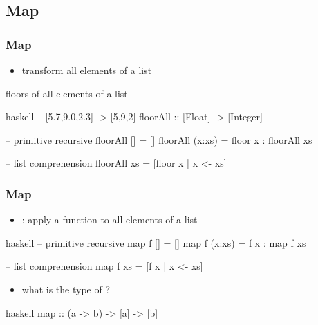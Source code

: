 \documentclass[dvipsnames]{beamer}
\theoremstyle{plain}
\begin{document}
\subsection{Map}

\begin{frame}[fragile]
  \frametitle{Map}

  \begin{itemize}
    \item transform all elements of a list
  \end{itemize}

  \begin{exampleblock}{floors of all elements of a list}
    \begin{pygments}{haskell}
-- [5.7,9.0,2.3] -> [5,9,2]
floorAll :: [Float] -> [Integer]

-- primitive recursive
floorAll []     = []
floorAll (x:xs) = floor x : floorAll xs

-- list comprehension
floorAll xs = [floor x | x <- xs]
    \end{pygments}
  \end{exampleblock}
\end{frame}

\begin{frame}[fragile]
  \frametitle{Map}

  \begin{itemize}
    \item {}: apply a function to all elements of a list
  \end{itemize}

  \begin{exampleblock}{}
    \begin{pygments}{haskell}
-- primitive recursive
map f []     = []
map f (x:xs) = f x : map f xs

-- list comprehension
map f xs = [f x | x <- xs]
    \end{pygments}
  \end{exampleblock}

  \pause
  \begin{itemize}
    \item what is the type of ?
  \end{itemize}

  \begin{pygments}{haskell}
map :: (a -> b) -> [a] -> [b]
  \end{pygments}
\end{frame}
\end{document}

